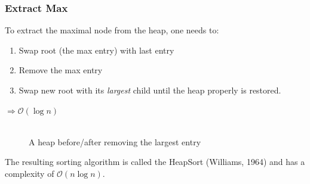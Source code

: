 \subsubsection{Extract Max} To extract the maximal node from the heap, one needs to:
\begin{enumerate}
\item Swap root (the max entry) with last entry
\item Remove the max entry
\item Swap new root with its \emph{largest} child until the heap properly is restored.
\end{enumerate}
$\Rightarrow \mathcal{O}(\log n)$
\\ \\

\begin{figure}[htbp]
\centering
{}
\caption{A heap before/after removing the largest entry}
\label{tree4-5}
\end{figure}
The resulting sorting algorithm is called the HeapSort (Williams, 1964) and has a complexity of $\mathcal{O}(n\log n)$.

